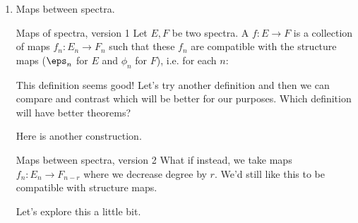 \begin{enumerate}
    \begin{definition}{}{}
        Let $E$ be a spectrum. The $r$th homotopy group of $E$ is defined to be:
        $$\pi_r E:=\underset{n\to\infty}{\colim}~\pi_{n+r}E_n.$$
    \end{definition}
    If we take $E = \Sigma^\infty X$, then $\pi_n E = \pi_n^{st} X$, the stable homotopy groups of $X$. This definition recovers the definition of stable homotopy groups! Great!
    \item Maps between spectra. 
    
    \begin{definition}{Maps of spectra, version 1}{}
        Let $E, F$ be two spectra. A  $f:E\to F$ is a collection of maps $f_n:E_n\to F_n$ such that these $f_n$ are compatible with the structure maps ($\eps_n$ for $E$ and $\phi_n$ for $F$), i.e. for each $n$: 
        \begin{center}
        \end{center}
    \end{definition}
    This definition seems good! Let's try another definition and then we can compare and contrast which will be better for our purposes. Which definition will have better theorems?

    Here is another construction. 
    \begin{definition}{Maps between spectra, version 2}{}
        What if instead, we take maps $f_n:E_n\to F_{n-r}$ where we decrease degree by $r$. We'd still like this to be compatible with structure maps. 
        \begin{center}
          \end{center}
    \end{definition}
    Let's explore this a little bit. 


\end{enumerate}
